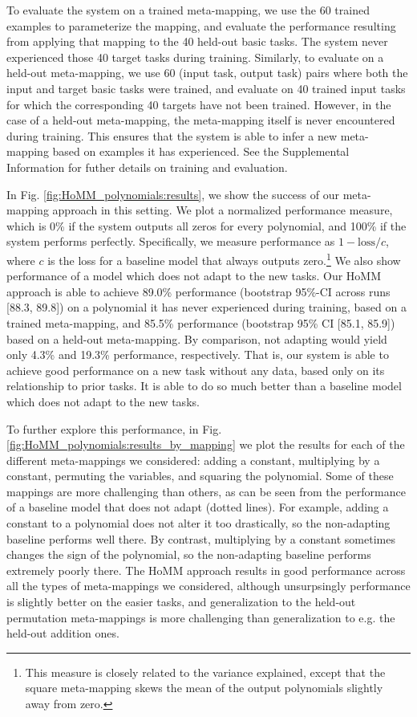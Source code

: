 To evaluate the system on a trained meta-mapping, we use the 60 trained examples to parameterize the mapping, and evaluate the performance resulting from applying that mapping to the 40 held-out basic tasks. The system never experienced those 40 target tasks during training. Similarly, to evaluate on a held-out meta-mapping, we use 60 (input task, output task) pairs where both the input and target basic tasks were trained, and evaluate on 40 trained input tasks for which the corresponding 40 targets have not been trained. However, in the case of a held-out meta-mapping, the meta-mapping itself is never encountered during training. This ensures that the system is able to infer a new meta-mapping based on examples it has experienced. See the Supplemental Information for futher details on training and evaluation.

In Fig. \ref{fig:HoMM_polynomials:results}, we show the success of our meta-mapping approach in this setting. We plot a normalized performance measure, which is 0\% if the system outputs all zeros for every polynomial, and 100\% if the system performs perfectly. Specifically, we measure performance as \(1 - \text{loss}/c\), where \(c\) is the loss for a baseline model that always outputs zero.\footnote{This measure is closely related to the variance explained, except that the square meta-mapping skews the mean of the output polynomials slightly away from zero.} We also show performance of a model which does not adapt to the new tasks. Our HoMM approach is able to achieve 89.0\% performance (bootstrap 95\%-CI across runs [88.3, 89.8]) on a polynomial it has never experienced during training, based on a trained meta-mapping, and 85.5\% performance (bootstrap 95\% CI [85.1, 85.9]) based on a held-out meta-mapping. By comparison, not adapting would yield only 4.3\% and 19.3\% performance, respectively. That is, our system is able to achieve good performance on a new task without any data, based only on its relationship to prior tasks. It is able to do so much better than a baseline model which does not adapt to the new tasks. 

To further explore this performance, in Fig. \ref{fig:HoMM_polynomials:results_by_mapping} we plot the results for each of the different meta-mappings we considered: adding a constant, multiplying by a constant, permuting the variables, and squaring the polynomial. Some of these mappings are more challenging than others, as can be seen from the performance of a baseline model that does not adapt (dotted lines). For example, adding a constant to a polynomial does not alter it too drastically, so the non-adapting baseline performs well there. By contrast, multiplying by a constant sometimes changes the sign of the polynomial, so the non-adapting baseline performs extremely poorly there. The HoMM approach results in good performance across all the types of meta-mappings we considered, although unsurpsingly performance is slightly better on the easier tasks, and generalization to the held-out permutation meta-mappings is more challenging than generalization to e.g. the held-out addition ones. 

